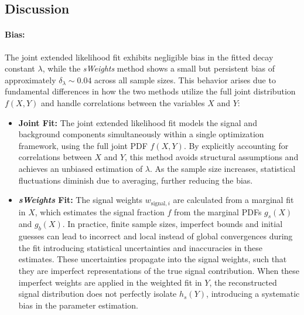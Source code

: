 \documentclass[11pt, a4paper]{article}
\begin{document}
\subsection{Discussion}

\paragraph{Bias:}  
The joint extended likelihood fit exhibits negligible bias in the fitted decay constant \(\lambda\), while the \textit{sWeights} method shows a small but persistent bias of approximately \( \delta_{\lambda} \sim 0.04 \) across all sample sizes. This behavior arises due to fundamental differences in how the two methods utilize the full joint distribution \( f(X, Y) \) and handle correlations between the variables \( X \) and \( Y \):

\begin{itemize}
    \item \textbf{Joint Fit:}  
    The joint extended likelihood fit models the signal and background components simultaneously within a single optimization framework, using the full joint PDF \( f(X, Y) \). By explicitly accounting for correlations between \( X \) and \( Y \), this method avoids structural assumptions and achieves an unbiased estimation of \(\lambda\). As the sample size increases, statistical fluctuations diminish due to averaging, further reducing the bias.
    
\item \textbf{\textit{sWeights} Fit:}  
The signal weights \( w_{\text{signal},i} \) are calculated from a marginal fit in \( X \), which estimates the signal fraction \( f \) from the marginal PDFs \( g_s(X) \) and \( g_b(X) \). In practice, finite sample sizes, imperfect bounds and initial guesses can lead to incorrect and local instead of global convergences during the fit introducing statistical uncertainties and inaccuracies in these estimates. These uncertainties propagate into the signal weights, such that they are imperfect representations of the true signal contribution. When these imperfect weights are applied in the weighted fit in \( Y \), the reconstructed signal distribution does not perfectly isolate \( h_s(Y) \), introducing a systematic bias in the parameter estimation.





\end{itemize}
\end{document}

